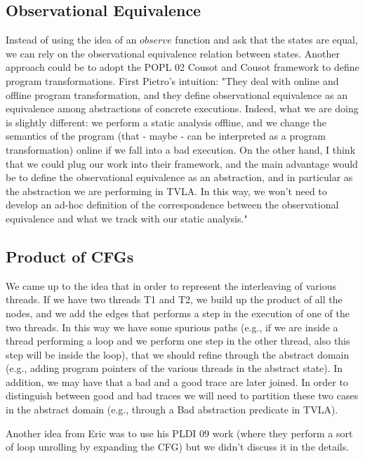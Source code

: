 \subsection{Observational Equivalence}
Instead of using the idea of an $\mathit{observe}$ function and ask that the states are equal, we can rely on the observational equivalence relation between states. Another approach could be to adopt the POPL 02 Cousot and Cousot framework to define program transformations. First Pietro's intuition: "They deal with online and offline program transformation, and they define observational equivalence as an equivalence among abstractions of concrete executions. Indeed, what we are doing is slightly different: we perform a static analysis offline, and we change the semantics of the program (that - maybe - can be interpreted as a program transformation) online if we fall into a bad execution. On the other hand, I think that we could plug our work into their framework, and the main advantage would be to define the observational equivalence as an abstraction, and in particular as the abstraction we are performing in TVLA. In this way, we won't need to develop an ad-hoc definition of the correspondence between the observational equivalence and what we track with our static analysis."

\subsection{Product of CFGs}
We came up to the idea that in order to represent the interleaving of various threads. If we have two threads T1 and T2, we build up the product of all the nodes, and we add the edges that performs a step in the execution of one of the two threads. In this way we have some spurious paths (e.g., if we are inside a thread performing a loop and we perform one step in the other thread, also this step will be inside the loop), that we should refine through the abstract domain (e.g., adding program pointers of the various threads in the abstract state). In addition, we may have that a bad and a good trace are later joined. In order to distinguish between good and bad traces we will need to partition these two cases in the abstract domain (e.g., through a Bad abstraction predicate in TVLA).

Another idea from Eric was to use his PLDI 09 work (where they perform a sort of loop unrolling by expanding the CFG) but we didn't discuss it in the details.


